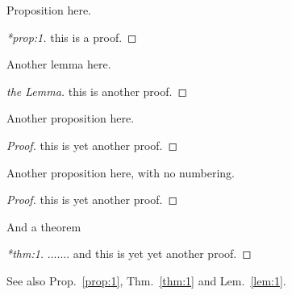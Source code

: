 \documentclass[12pt,a5paper]{article}
\begin{document}
\begin{prop}
  \label{prop:1}
  Proposition here.
\end{prop}
\begin{proof}[*prop:1]
  this is a proof.
\end{proof}

\bigskip

\begin{lem}
\label{lem:1}
Another lemma here.
\end{lem}
\begin{proof}[the Lemma]
  this is another proof.
\end{proof}

\bigskip

\begin{prop}
Another proposition here.
\end{prop}
\begin{proof}
  this is yet another proof.
\end{proof}

\bigskip

\begin{prop*}
Another proposition here, with no numbering.
\end{prop*}
\begin{proof}
  this is yet another proof.
\end{proof}

\bigskip

\begin{thm}
\label{thm:1}
And a theorem
\end{thm}
\begin{proof}[*thm:1]
  ....... and  this is yet yet another proof.
\end{proof}

\bigskip

See also Prop.~\ref{prop:1}, Thm.~\ref{thm:1} and Lem.~\ref{lem:1}.
\end{document}
